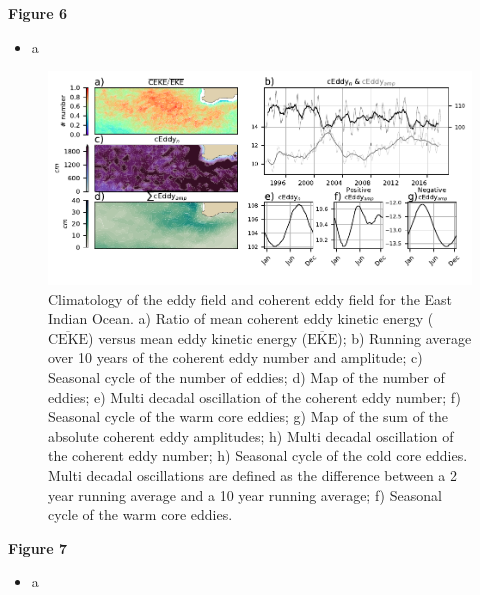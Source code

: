 \documentclass[draft,linenumbers]{agujournal2019}
\newcommand{\MEKE}{\overline{\textrm{EKE}}}
\newcommand{\MCEKE}{\overline{\textrm{CEKE}}}
\begin{document}
	\textbf{Figure 6}
	\begin{itemize}
		\item a
	\end{itemize}

	\begin{figure}
	    \centering
	    \includegraphics[width=1\textwidth]{figures/regional_ratios_and_stats_V3_0.pdf}
	    \caption{Climatology of the eddy field and coherent eddy field for the East Indian Ocean. a) Ratio of mean coherent eddy kinetic energy ($\MCEKE$) versus mean eddy kinetic energy ($\MEKE$); b) Running average over 10 years of the coherent eddy number and amplitude; c) Seasonal cycle of the number of eddies; d) Map of the number of eddies; 
		e) Multi decadal oscillation of the coherent eddy number; f) Seasonal cycle of the warm core eddies; g) Map of the sum of the absolute coherent eddy amplitudes;  h) Multi decadal oscillation of the coherent eddy number; h) Seasonal cycle of the cold core eddies. Multi decadal oscillations are defined as the difference between a 2 year running average and a 10 year running average; f) Seasonal cycle of the warm core eddies.}
	    \label{fig:east_indian_cycle}
	\end{figure}

	\textbf{Figure 7}
	\begin{itemize}
		\item a
	\end{itemize}
\end{document}
